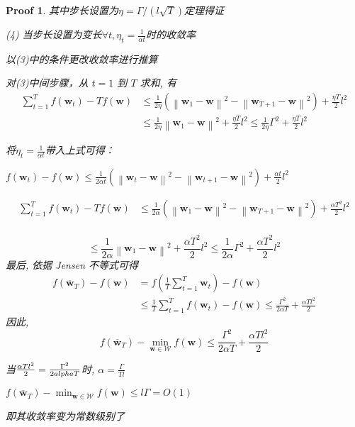 \documentclass[a4paper,UTF8]{article}
\numberwithin{equation}{section}
\newtheorem*{myProof}{Proof}
\begin{document}
\begin{myProof}
		其中步长设置为$\eta=\Gamma /(l \sqrt{T})$定理得证
		
		
		(4) 当步长设置为变长$\forall t, \eta_{t}=\frac{1}{\alpha t}$时的收敛率
		
		以(3)中的条件更改收敛率进行推算
		
		对(3)中间步骤，从 $t=1$ 到 $T$ 求和, 有
		$$
		\begin{aligned}
			\sum_{t=1}^{T} f\left(\boldsymbol{w}_{t}\right)-T f(\boldsymbol{w}) & \leqslant \frac{1}{2 \eta}\left(\left\|\boldsymbol{w}_{1}-\boldsymbol{w}\right\|^{2}-\left\|\boldsymbol{w}_{T+1}-\boldsymbol{w}\right\|^{2}\right)+\frac{\eta T}{2} l^{2} \\
			& \leqslant \frac{1}{2 \eta}\left\|\boldsymbol{w}_{1}-\boldsymbol{w}\right\|^{2}+\frac{\eta T}{2} l^{2} \leqslant \frac{1}{2 \eta} \Gamma^{2}+\frac{\eta T}{2} l^{2}
		\end{aligned}
		$$
		
		将$\eta_{t}=\frac{1}{\alpha t}$带入上式可得：
		
		$f\left(\boldsymbol{w}_{t}\right)-f(\boldsymbol{w}) \leqslant \frac{1}{2 \alpha t}\left(\left\|\boldsymbol{w}_{t}-\boldsymbol{w}\right\|^{2}-\left\|\boldsymbol{w}_{t+1}-\boldsymbol{w}\right\|^{2}\right)+\frac{\alpha t}{2} l^{2}$
		
		$$
		\begin{aligned}
			\sum_{t=1}^{T} f\left(\boldsymbol{w}_{t}\right)-T f(\boldsymbol{w}) & \leqslant \frac{1}{2 \alpha }\left(\left\|\boldsymbol{w}_{1}-\boldsymbol{w}\right\|^{2}-\left\|\boldsymbol{w}_{T+1}-\boldsymbol{w}\right\|^{2}\right)+\frac{\alpha  T^2}{2} l^{2} \\
		\end{aligned}
		$$
		
		$$
		\leqslant \frac{1}{2 \alpha}\left\|\boldsymbol{w}_{1}-\boldsymbol{w}\right\|^{2}+\frac{\alpha  T^2}{2} l^{2} \leqslant \frac{1}{2 \alpha} \Gamma^{2}+\frac{\alpha  T^2}{2} l^{2}
		$$
		最后, 依据 Jensen 不等式可得
		$$
		\begin{aligned}
			f\left(\overline{\boldsymbol{w}}_{T}\right)-f(\boldsymbol{w}) &=f\left(\frac{1}{T} \sum_{t=1}^{T} \boldsymbol{w}_{t}\right)-f(\boldsymbol{w}) \\
			& \leqslant \frac{1}{T} \sum_{t=1}^{T} f\left(\boldsymbol{w}_{t}\right)-f(\boldsymbol{w}) \leqslant \frac{\Gamma^{2}}{2 \alpha T}+\frac{\alpha T l^{2}}{2}
		\end{aligned}
		$$
		因此,
		$$
		f\left(\overline{\boldsymbol{w}}_{T}\right)-\min _{\boldsymbol{w} \in \mathcal{W}} f(\boldsymbol{w}) \leqslant \frac{\Gamma^{2}}{2 \alpha T}+\frac{\alpha T l^{2}}{2}
		$$
		
		当$\frac{\alpha T l^{2}}{2}=\frac{\Gamma^{2}}{2 \\alpha T}$时, $\alpha = \frac{\Gamma}{Tl}$
		
		$f\left(\overline{\boldsymbol{w}}_{T}\right)-\min _{\boldsymbol{w} \in \mathcal{W}} f(\boldsymbol{w}) \leqslant l\Gamma = O(1)$
		
		即其收敛率变为常数级别了
		
		
		
		
	\end{myProof}
	
\end{document}
